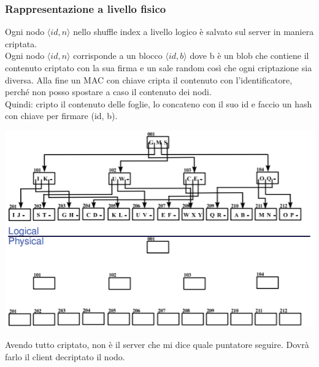 \subsubsection{Rappresentazione a livello fisico}
Ogni nodo \(\langle id, n \rangle\) nello shuffle index a livello logico è salvato sul server in maniera criptata.\\
Ogni nodo \(\langle id, n \rangle\) corrisponde a un blocco \(\langle id, b \rangle\) dove b è un blob che contiene il contenuto criptato con la sua firma e un sale random così che ogni criptazione sia diversa. Alla fine un MAC con chiave cripta il contenuto con l’identificatore, perché non posso spostare a caso il contenuto dei nodi.\\
Quindi: cripto il contenuto delle foglie, lo concateno con il suo id e faccio un hash con chiave per firmare (id, b).
\begin{center}
    \includegraphics[scale=0.8]{img/logfis.png}
\end{center}
Avendo tutto criptato, non è il server che mi dice quale puntatore seguire. Dovrà farlo il client decriptato il nodo.
